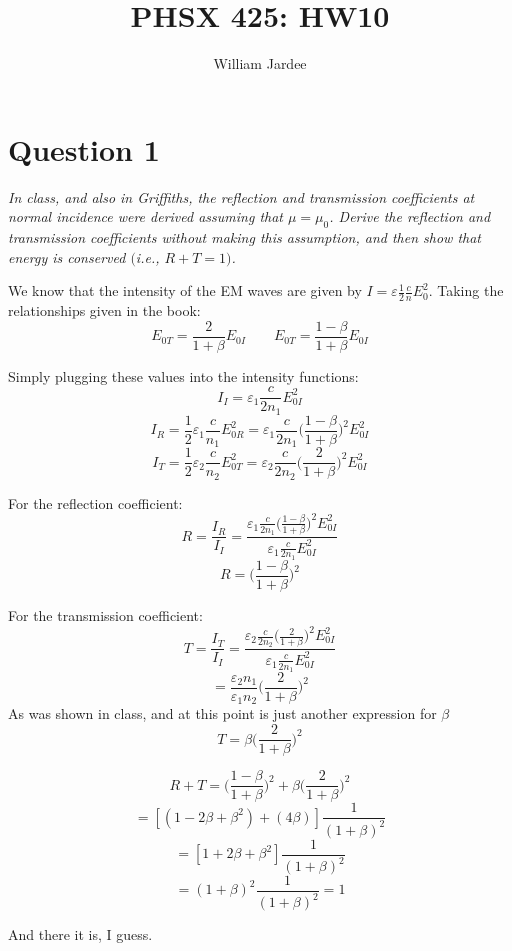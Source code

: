 \documentclass[12pt]{article}
\begin{document}
\title{PHSX 425: HW10}
\author{William Jardee}
\maketitle

\section*{Question 1}
\emph{In class, and also in Griffiths, the reflection and transmission coefficients at normal incidence were derived assuming that $\mu = \mu_0$. Derive the reflection and transmission coefficients without making this assumption, and then show that energy is conserved $($i.e., $R + T = 1)$.}\bigskip

We know that the intensity of the EM waves are given by $I = \varepsilon \frac{1}{2}\frac{c}{n}E_0^2$. Taking the relationships given in the book:
\[E_{0T} = \frac{2}{1+\beta}E_{0I} \qquad E_{0T} = \frac{1-\beta}{1+\beta}E_{0I}\]

Simply plugging these values into the intensity functions:
\[I_I = \varepsilon_1 \frac{c}{2n_1}E_{0I}^2\]
\[I_R = \frac{1}{2}\varepsilon_1 \frac{c}{n_1}E_{0R}^2 = \varepsilon_1 \frac{c}{2n_1}\Big(\frac{1-\beta}{1+\beta}\Big)^2 E_{0I}^2\]
\[I_T = \frac{1}{2}\varepsilon_2\frac{c}{n_2}E_{0T}^2 = \varepsilon_2 \frac{c}{2n_2}\Big(\frac{2}{1+\beta}\Big)^2 E_{0I}^2\]

For the reflection coefficient:
\[R = \frac{I_R}{I_I} = \frac{\varepsilon_1 \frac{c}{2n_1}\Big(\frac{1-\beta}{1+\beta}\Big)^2 E_{0I}^2}{\varepsilon_1 \frac{c}{2n_1}E_{0I}^2}\]
\[\boxed{R = \Big(\frac{1-\beta}{1+\beta}\Big)^2}\]

For the transmission coefficient:
\[T = \frac{I_T}{I_I} = \frac{\varepsilon_2 \frac{c}{2n_2}\Big(\frac{2}{1+\beta}\Big)^2 E_{0I}^2}{\varepsilon_1 \frac{c}{2n_1}E_{0I}^2}\]
\[= \frac{\varepsilon_2 n_1}{\varepsilon_1 n_2}\Big(\frac{2}{1+\beta}\Big)^2\]
As was shown in class, and at this point is just another expression for $\beta$
\[\boxed{ T = \beta \Big(\frac{2}{1+\beta}\Big)^2}\]\bigskip

\[R + T = \Big(\frac{1-\beta}{1+\beta}\Big)^2 + \beta \Big(\frac{2}{1+\beta}\Big)^2\]
\[= [(1 - 2\beta + \beta^2) + (4\beta)]\frac{1}{(1+\beta)^2}\]
\[= [1 +2\beta + \beta^2]\frac{1}{(1+\beta)^2}\]
\[= (1+\beta)^2 \frac{1}{(1+\beta)^2} = 1\]

And there it is, I guess. 




\newpage
\end{document}
